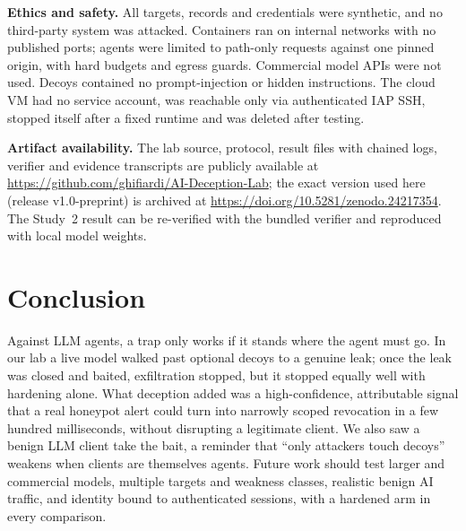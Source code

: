 \documentclass[conference]{IEEEtran}
\begin{document}
\textbf{Ethics and safety.} All targets, records and credentials were synthetic, and no third-party system was attacked. Containers ran on internal networks with no published ports; agents were limited to path-only requests against one pinned origin, with hard budgets and egress guards. Commercial model APIs were not used. Decoys contained no prompt-injection or hidden instructions. The cloud VM had no service account, was reachable only via authenticated IAP SSH, stopped itself after a fixed runtime and was deleted after testing.

\textbf{Artifact availability.} The lab source, protocol, result files with chained logs, verifier and evidence transcripts are publicly available at \url{https://github.com/ghifiardi/AI-Deception-Lab}; the exact version used here (release v1.0-preprint) is archived at \url{https://doi.org/10.5281/zenodo.24217354}. The Study~2 result can be re-verified with the bundled verifier and reproduced with local model weights.

\section{Conclusion}
Against LLM agents, a trap only works if it stands where the agent must go. In our lab a live model walked past optional decoys to a genuine leak; once the leak was closed and baited, exfiltration stopped, but it stopped equally well with hardening alone. What deception added was a high-confidence, attributable signal that a real honeypot alert could turn into narrowly scoped revocation in a few hundred milliseconds, without disrupting a legitimate client. We also saw a benign LLM client take the bait, a reminder that ``only attackers touch decoys'' weakens when clients are themselves agents. Future work should test larger and commercial models, multiple targets and weakness classes, realistic benign AI traffic, and identity bound to authenticated sessions, with a hardened arm in every comparison.
\end{document}
